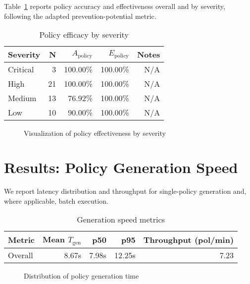 Table~\ref{tab:efficacy-by-severity} reports policy accuracy and effectiveness overall and by severity, following the adapted prevention-potential metric.

\begin{table}[htbp]
	\centering
		\caption{Policy efficacy by severity}\label{tab:efficacy-by-severity}
	\begin{tabular}{lrrrr}
		\hline
		Severity & N & $A_{\text{policy}}$ & $E_{\text{policy}}$ & Notes \\
		\hline
		Critical & 3 & 100.00\% & 100.00\% & N/A \\
		High & 21 & 100.00\% & 100.00\% & N/A \\
		Medium & 13 & 76.92\% & 100.00\% & N/A \\
		Low & 10 & 90.00\% & 100.00\% & N/A \\
		\hline
	\end{tabular}
\end{table}

\begin{figure}[htbp]
	\centering
		\caption{Visualization of policy effectiveness by severity}\label{fig:efficacy-plot}
\end{figure}

\section{Results: Policy Generation Speed}\label{sec:results-speed}

We report latency distribution and throughput for single-policy generation and, where applicable, batch execution.

\begin{table}[htbp]
	\centering
		\caption{Generation speed metrics}\label{tab:speed-metrics}
	\begin{tabular}{lrrrr}
		\hline
		Metric & Mean $T_{\text{gen}}$ & p50 & p95 & Throughput (pol/min) \\
		\hline
		Overall & 8.67s & 7.98s & 12.25s & 7.23 \\
		\hline
	\end{tabular}
\end{table}

\begin{figure}[htbp]
	\centering
		\caption{Distribution of policy generation time}\label{fig:speed-distribution}
\end{figure}

